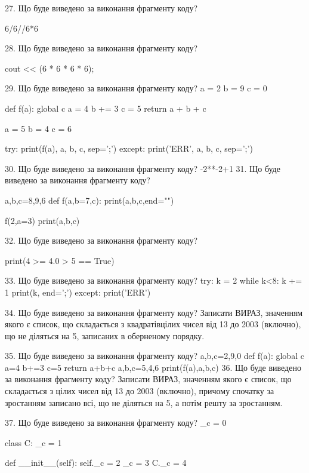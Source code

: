 \documentclass[11pt]{article}
\begin{document}
27. Що буде виведено за виконання фрагменту коду?

6/6//6*6

28. Що буде виведено за виконання фрагменту коду?

cout << (6 * 6 * 6 * 6);

29. Що буде виведено за виконання фрагменту коду?
a = 2
b = 9
c = 0

def f(a):
global c    a = 4
    b += 3
    c = 5
    return a + b + c

a = 5
b = 4
c = 6

try:
    print(f(a), a, b, c, sep=';')
except:
    print('ERR', a, b, c, sep=';')

30. Що буде виведено за виконання фрагменту коду?
-2**-2+1
31. Що буде виведено за виконання фрагменту коду?

a,b,c=8,9,6
def f(a,b=7,c):
    print(a,b,c,end="")

f(2,a=3)
print(a,b,c)


32. Що буде виведено за виконання фрагменту коду?

print(4 >= 4.0 > 5 == True)

33. Що буде виведено за виконання фрагменту коду?
try:
    k = 2
    while k<8:
        k += 1
    print(k, end=';')
except:
    print('ERR')

34. Що буде виведено за виконання фрагменту коду?
Записати ВИРАЗ, значенням якого є список, що складається з квадратівцілих чисел від 13 до 2003 (включно), що не діляться на 5, записаних в обернено\-му порядку.

35. Що буде виведено за виконання фрагменту коду?
a,b,c=2,9,0
   def f(a):
     global c     a=4
     b+=3
     c=5
     return a+b+c
   a,b,c=5,4,6
   print(f(a),a,b,c)
36. Що буде виведено за виконання фрагменту коду?
Записати ВИРАЗ, значенням якого є список, що складається з цілих чисел від 13 до 2003 (включно), причому спочатку за зростанням записано всі, що не діляться на 5, а потім решту за зростанням.

37. Що буде виведено за виконання фрагменту коду?
_c = 0

class C:
    _c = 1
    
    def __init__(self):
        self._c = 2
        _c = 3
        C._c = 4
\end{document}
